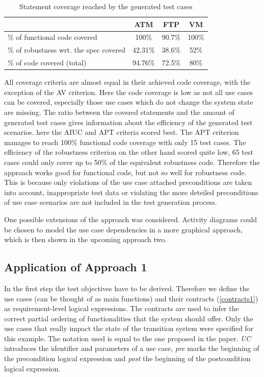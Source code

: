 \begin{table}[h] 
	\centering
	\begin{small}
		\caption{Statement coverage reached by the generated test cases}
		\label{codecoverage}
		\setlength{\tabcolsep}{1em}
		\begin{tabular}{l|c|c|c}
			\hline
			& \textbf{ATM} & \textbf{FTP} & \textbf{VM} \\
			\hline
			\hline	
			\% of functional code covered & 100\% & 90.7\% & 100\% \\
			\hline
			\% of robustness wrt. the spec covered & 42.31\% & 38.6\% & 52\% \\
			\hline
			\% of code covered (total) & 94.76\% & 72.5\% & 80\% \\
			\hline
		\end{tabular}
	\end{small}
\end{table}

All coverage criteria are almost equal in their achieved code coverage, with the exception of the AV criterion. Here the code coverage is low as not all use cases can be covered, especially those use cases which do not change the system state are missing. The ratio between the covered statements and the amount of generated test cases gives information about the efficiency of the generated test scenarios. here the AIUC and APT criteria scored best. The APT criterion manages to reach 100\% functional code coverage with only 15 test cases. The efficiency of the robustness criterion on the other hand scored quite low, 65 test cases could only cover up to 50\% of the equivalent robustness code. Therefore the approach works good for functional code, but not so well for robustness code. This is because only violations of the use case attached preconditions are taken into account, inappropriate test data or violating the more deteiled preconditions of use case scenarios are not included in the test generation process. 

One possible extensions of the approach was considered. Activity diagrams could be chosen to model the use case dependencies in a more graphical approach, which is then shown in the upcoming approach two. 

\subsection{Application of Approach 1}

In the first step the test objectives have to be derived. Therefore we define the use cases (can be thought of as main functions) and their contracts (\autoref{contracts1}) as requirement-level logical expressions. The contracts are used to infer the correct partial ordering of functionalities that the system should offer. Only the use cases that really impact the state of the transition system were specified for this example. The notation used is equal to the one proposed in the paper. \textit{UC} introduces the identifier and parameters of a use case, \textit{pre} marks the beginning of the precondition logical expression and \textit{post} the beginning of the postcondition logical expression. 

